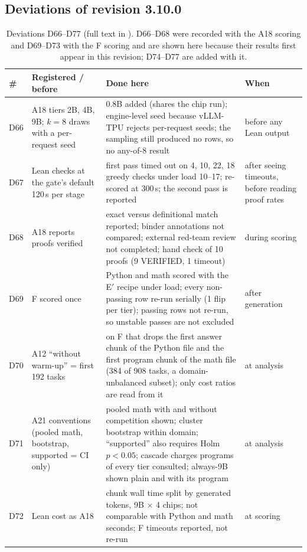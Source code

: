\documentclass[11pt,a4paper]{article}
\newcommand{\code}[1]{\texttt{\detokenize{#1}}}
\begin{document}
\subsection{Deviations of revision 3.10.0}

\begin{table}[!htbp]\centering\scriptsize\setlength{\tabcolsep}{4pt}
\caption{Deviations D66--D77 (full text in \code{docs/DEVIATIONS.md}). D66--D68 were recorded with the A18 scoring and D69--D73 with the F scoring and are shown here because their results first appear in this revision; D74--D77 are added with it.}
\label{tab:dev3100}
\begin{tabular}{l p{4.0cm} p{6.8cm} p{2.0cm}}\toprule
\# & Registered / before & Done here & When\\\midrule
D66 & A18 tiers 2B, 4B, 9B; $k=8$ draws with a per-request seed & 0.8B added (shares the chip run); engine-level seed because vLLM-TPU rejects per-request seeds; the sampling still produced no rows, so no any-of-8 result & before any Lean output\\
D67 & Lean checks at the gate's default 120\,s per stage & first pass timed out on 4, 10, 22, 18 greedy checks under load 10--17; re-scored at 300\,s; the second pass is reported & after seeing timeouts, before reading proof rates\\
D68 & A18 reports proofs verified & exact versus definitional match reported; binder annotations not compared; external red-team review not completed; hand check of 10 proofs (9 VERIFIED, 1 timeout) & during scoring\\
D69 & F scored once & Python and math scored with the E$'$ recipe under load; every non-passing row re-run serially (1 flip per tier); passing rows not re-run, so unstable passes are not excluded & after generation\\
D70 & A12 ``without warm-up'' = first 192 tasks & on F that drops the first answer chunk of the Python file and the first program chunk of the math file (384 of 908 tasks, a domain-unbalanced subset); only cost ratios are read from it & at analysis\\
D71 & A21 conventions (pooled math, bootstrap, supported = CI only) & pooled math with and without competition shown; cluster bootstrap within domain; ``supported'' also requires Holm $p<0.05$; cascade charges programs of every tier consulted; always-9B shown plain and with its program & at analysis\\
D72 & Lean cost as A18 & chunk wall time split by generated tokens, 9B $\times$ 4 chips; not comparable with Python and math seconds; F timeouts reported, not re-run & at scoring\\

\end{tabular}
\end{table}
\end{document}
